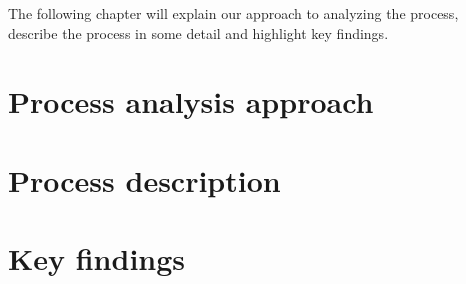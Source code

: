 The following chapter will explain our approach to analyzing the process, describe the process in some detail and highlight key findings.

\section{Process analysis approach}

\section{Process description}

\section{Key findings}
